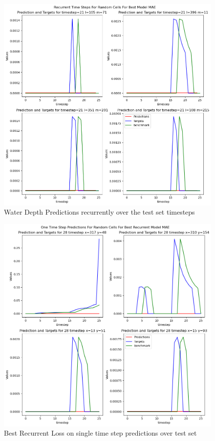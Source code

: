 \begin{figure}[tbph]
	\centering
	\includegraphics[width=0.8\linewidth, height=0.3\textheight]{Figures/Results/Final_Results/Best_Model_recurrentMAE_recurrent_random_cell}
	\caption[Best Recurrent MAE random cell over time]{Water Depth Predictions recurrently over the test set timesteps}
	\label{fig:BRMR}
\end{figure}
\begin{figure}[tbph]
	\centering
	\includegraphics[width=0.8\linewidth, height=0.3\textheight]{Figures/Results/Final_Results/Best_Model_recurrentMAE_SS_random_cell}
	\caption[Best Recurrent Loss on single time step predictions over test set]{Best Recurrent Loss on single time step predictions over test set}
	\label{fig:BRMS}
\end{figure}


